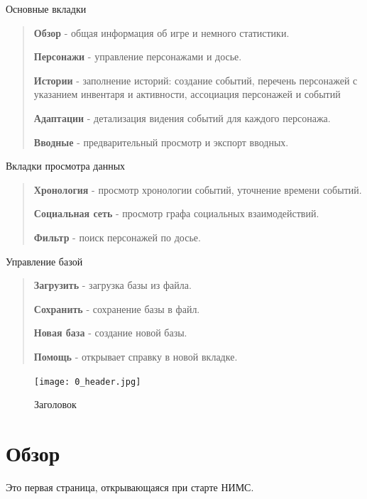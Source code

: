 \documentclass[a4paper,oneside,10pt,russian]{sphinxmanual}
\begin{document}
Основные вкладки
\begin{quote}

\textbf{Обзор} - общая информация об игре и немного статистики.

\textbf{Персонажи} - управление персонажами и досье.

\textbf{Истории} - заполнение историй: создание событий, перечень персонажей с указанием инвентаря и активности, ассоциация персонажей и событий

\textbf{Адаптации} - детализация видения событий для каждого персонажа.

\textbf{Вводные} - предварительный просмотр и экспорт вводных.
\end{quote}

Вкладки просмотра данных
\begin{quote}

\textbf{Хронология} - просмотр хронологии событий, уточнение времени событий.

\textbf{Социальная сеть} - просмотр графа социальных взаимодействий.

\textbf{Фильтр} - поиск персонажей по досье.
\end{quote}

Управление базой
\begin{quote}

\textbf{Загрузить} - загрузка базы из файла.

\textbf{Сохранить} - сохранение базы в файл.

\textbf{Новая база} - создание новой базы.

\textbf{Помощь} - открывает справку в новой вкладке.
\end{quote}
\begin{figure}[H]
\centering
\capstart

\texttt{[image: 0\_header.jpg]}
\caption{Заголовок}\end{figure}
\newpage

\section{Обзор}
\label{pages:overview-desc}\label{pages:id3}
Это первая страница, открывающаяся при старте НИМС.
\end{document}
